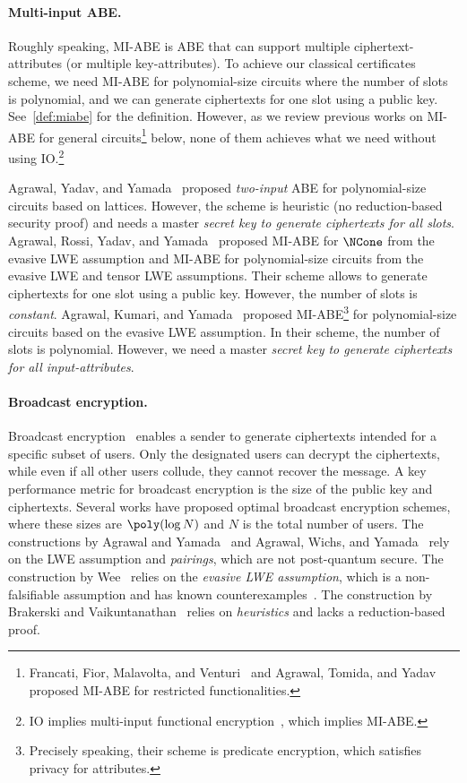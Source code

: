 \paragraph{Multi-input ABE.}
Roughly speaking, MI-ABE is ABE that can support multiple ciphertext-attributes (or multiple key-attributes).
To achieve our classical certificates scheme, we need MI-ABE for polynomial-size circuits where the number of slots is polynomial, and we can generate ciphertexts for one slot using a public key. See~\cref{def:miabe} for the definition.
However, as we review previous works on MI-ABE for general circuits\footnote{Francati, Fior, Malavolta, and Venturi~\cite{EC:FFMV23} and Agrawal, Tomida, and Yadav~\cite{C:AgrTomYad23} proposed MI-ABE for restricted functionalities.} below, none of them achieves what we need without using IO.\footnote{IO implies multi-input functional encryption~\cite{EC:GGGJKL14}, which implies MI-ABE.}

Agrawal, Yadav, and Yamada~\cite{C:AgrYadYam22} proposed \emph{two-input} ABE for polynomial-size circuits based on lattices. However, the scheme is heuristic (no reduction-based security proof) and needs a master \emph{secret key to generate ciphertexts for all slots}.
Agrawal, Rossi, Yadav, and Yamada~\cite{C:ARYY23} proposed MI-ABE for
$\NCone$ from the evasive LWE assumption and MI-ABE for
polynomial-size circuits from the evasive LWE and tensor LWE
assumptions. Their scheme allows to generate ciphertexts for one slot using a public key. However, the number of slots is \emph{constant}.
Agrawal, Kumari, and Yamada~\cite{myEPRINT:AgrKumYam24a} proposed MI-ABE\footnote{Precisely speaking, their scheme is predicate encryption, which satisfies privacy for attributes.} for polynomial-size circuits based on the evasive LWE assumption.
In their scheme, the number of slots is polynomial. However, we need a master \emph{secret key to generate ciphertexts for all input-attributes}.

\paragraph{Broadcast encryption.}
Broadcast encryption~\cite{C:FiaNao93} enables a sender to generate ciphertexts intended for a specific subset of users.
Only the designated users can decrypt the ciphertexts, while even if all other users collude, they cannot recover the message. A key performance metric for broadcast encryption is the size of the public key and ciphertexts.
Several works have proposed optimal broadcast encryption schemes, where these sizes are $\poly(\log{N})$ and $N$ is the total number of users.
The constructions by Agrawal and Yamada~\cite{EC:AgrYam20} and Agrawal, Wichs, and Yamada~\cite{TCC:AgrWicYam20} rely on the LWE assumption and \emph{pairings}, which are not post-quantum secure. The construction by Wee~\cite{EC:Wee22} relies on the \emph{evasive LWE assumption}, which is a non-falsifiable assumption and has known counterexamples~\cite{AC:BrzUnaWoo24}. The construction by Brakerski and Vaikuntanathan~\cite{ITCS:BraVai22} relies on \emph{heuristics} and lacks a reduction-based proof.

